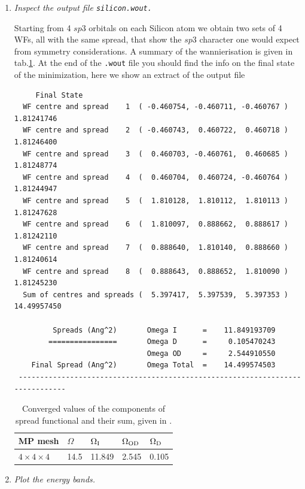 \begin{enumerate}
	\item {\it Inspect the output file \tt{silicon.wout}.} 

	Starting from 4 $sp3$ orbitals on each Silicon atom we obtain two sets of 4 WFs, all with the same spread, that show the $sp3$ character one would expect from symmetry considerations. A summary of the wannierisation is given in tab.\ref{tab3.1}. At the end of the {\tt .wout} file you should find the info on the final state of the minimization, here we show an extract of the output file
	\begin{tcolorbox}[sharp corners,boxrule=0.5pt]
	{\small
	\begin{verbatim}
	 Final State
  WF centre and spread    1  ( -0.460754, -0.460711, -0.460767 )     1.81241746
  WF centre and spread    2  ( -0.460743,  0.460722,  0.460718 )     1.81246400
  WF centre and spread    3  (  0.460703, -0.460761,  0.460685 )     1.81248774
  WF centre and spread    4  (  0.460704,  0.460724, -0.460764 )     1.81244947
  WF centre and spread    5  (  1.810128,  1.810112,  1.810113 )     1.81247628
  WF centre and spread    6  (  1.810097,  0.888662,  0.888617 )     1.81242110
  WF centre and spread    7  (  0.888640,  1.810140,  0.888660 )     1.81240614
  WF centre and spread    8  (  0.888643,  0.888652,  1.810090 )     1.81245230
  Sum of centres and spreads (  5.397417,  5.397539,  5.397353 )    14.49957450
 
         Spreads (Ang^2)       Omega I      =    11.849193709
        ================       Omega D      =     0.105470243
                               Omega OD     =     2.544910550
    Final Spread (Ang^2)       Omega Total  =    14.499574503
 ------------------------------------------------------------------------------
	\end{verbatim}
	}
	\end{tcolorbox}
	\begin{table}[b!]
	\centering
        \caption{Converged values of the components of spread functional and their sum, given in \angsqd{}.}
	\label{tab3.1}
	\begin{tabular}{@{} lllll @{}}\toprule[1.5pt]
	MP mesh & $\Omega$ & $\Omega\tinysub{I}$ & $\Omega\tinysub{OD}$ & $\Omega\tinysub{D}$ \\\midrule
	$4\times4\times4$ & 14.5 & 11.849 & 2.545 & 0.105 \\\bottomrule[1pt]
	\end{tabular}
	\end{table}
	\item {\it Plot the energy bands.}


\end{enumerate}

